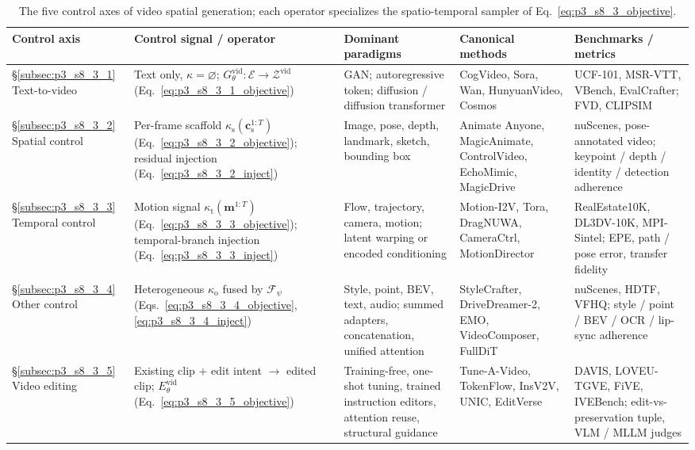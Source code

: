 \begin{table}[t]
    \centering
    \fontsize{8}{10}\selectfont
    \setlength{\tabcolsep}{1.0mm}
    \caption{The five control axes of video spatial generation; each operator specializes the spatio-temporal sampler of Eq.~\eqref{eq:p3_s8_3_objective}.}
    \label{tab:p3_s8_3_subfield_comparison}
    \begin{tabular}{L{0.12\textwidth} L{0.22\textwidth} L{0.18\textwidth} L{0.19\textwidth} L{0.21\textwidth}}
        \toprule
        \textbf{Control axis} & \textbf{Control signal / operator} & \textbf{Dominant paradigms} & \textbf{Canonical methods} & \textbf{Benchmarks / metrics} \\
        \midrule
        §\ref{subsec:p3_s8_3_1} Text-to-video & Text only, $\kappa=\varnothing$; $G_\theta^{\text{vid}}:\mathcal{E}\!\to\!\mathcal{Z}^{\text{vid}}$ (Eq.~\eqref{eq:p3_s8_3_1_objective}) & GAN; autoregressive token; diffusion / diffusion transformer & CogVideo, Sora, Wan, HunyuanVideo, Cosmos & UCF-101, MSR-VTT, VBench, EvalCrafter; FVD, CLIPSIM \\
        §\ref{subsec:p3_s8_3_2} Spatial control & Per-frame scaffold $\kappa_{\text{s}}(\mathbf{c}_{\text{s}}^{1:T})$ (Eq.~\eqref{eq:p3_s8_3_2_objective}); residual injection (Eq.~\eqref{eq:p3_s8_3_2_inject}) & Image, pose, depth, landmark, sketch, bounding box & Animate Anyone, MagicAnimate, ControlVideo, EchoMimic, MagicDrive & nuScenes, pose-annotated video; keypoint / depth / identity / detection adherence \\
        §\ref{subsec:p3_s8_3_3} Temporal control & Motion signal $\kappa_{\text{t}}(\mathbf{m}^{1:T})$ (Eq.~\eqref{eq:p3_s8_3_3_objective}); temporal-branch injection (Eq.~\eqref{eq:p3_s8_3_3_inject}) & Flow, trajectory, camera, motion; latent warping or encoded conditioning & Motion-I2V, Tora, DragNUWA, CameraCtrl, MotionDirector & RealEstate10K, DL3DV-10K, MPI-Sintel; EPE, path / pose error, transfer fidelity \\
        §\ref{subsec:p3_s8_3_4} Other control & Heterogeneous $\kappa_{\text{o}}$ fused by $\mathcal{F}_\psi$ (Eqs.~\eqref{eq:p3_s8_3_4_objective}, \eqref{eq:p3_s8_3_4_inject}) & Style, point, BEV, text, audio; summed adapters, concatenation, unified attention & StyleCrafter, DriveDreamer-2, EMO, VideoComposer, FullDiT & nuScenes, HDTF, VFHQ; style / point / BEV / OCR / lip-sync adherence \\
        §\ref{subsec:p3_s8_3_5} Video editing & Existing clip $+$ edit intent $\to$ edited clip; $E_\theta^{\text{vid}}$ (Eq.~\eqref{eq:p3_s8_3_5_objective}) & Training-free, one-shot tuning, trained instruction editors, attention reuse, structural guidance & Tune-A-Video, TokenFlow, InsV2V, UNIC, EditVerse & DAVIS, LOVEU-TGVE, FiVE, IVEBench; edit-vs-preservation tuple, VLM / MLLM judges \\
        \bottomrule
    \end{tabular}
\end{table}

